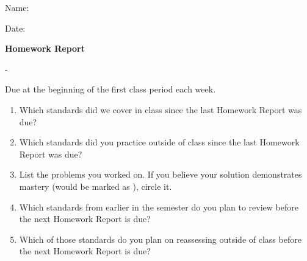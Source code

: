 

\usepackage[top=1in,bottom=1in,left=1in,right=1in]{geometry}

\pagestyle{empty}




\begin{flushright}
  Name: \underline{\hspace{3in}}

  \vspace{1em}

  Date: \underline{\hspace{2in}}
\end{flushright}

\begin{center}
  \Large
  \textbf{Homework Report}
\end{center}

\begin{center}
  \large \course{} - \prof{}
\end{center}

\begin{center}
  Due at the beginning of the first class period each week.
\end{center}

\begin{enumerate}[1)]
\item Which standards did we cover in class since the last Homework Report
      was due?

      \vfill
\item Which standards did you practice outside of class since the last
      Homework Report was due?

      \vfill
\item List the problems you worked on. If you believe your solution demonstrates
      mastery (would be marked as \masteryMark{}), circle it.

      \vfill\vfill
\item Which standards from earlier in the semester do you plan to review
      before the next Homework Report is due?

      \vfill
\item Which of those standards do you plan on reassessing outside of class
      before the next Homework Report is due?

      \vfill
\end{enumerate}


